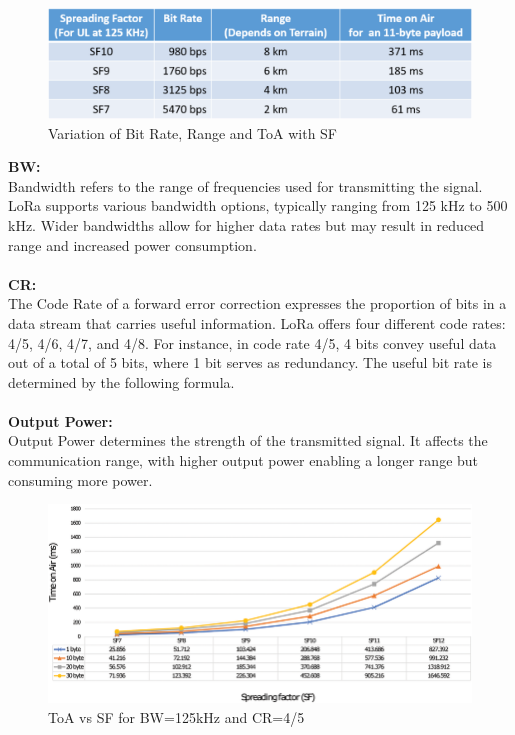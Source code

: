 \begin{figure}[htp!]
    \centering
    \includegraphics[scale=0.3]{images/sf with distance.png}
    \caption{Variation of Bit Rate, Range and \ac{ToA} with SF}
\end{figure}

\noindent\textbf{\ac{BW}:}\\

Bandwidth refers to the range of frequencies used for transmitting the signal. LoRa supports various bandwidth options, typically ranging from 125 kHz to 500 kHz. Wider bandwidths allow for higher data rates but may result in reduced range and increased power consumption.\\
\\
\textbf{\ac{CR}:}\\

The Code Rate of a forward error correction expresses the proportion of bits in a data stream that carries useful information. LoRa offers four different code rates: 4/5, 4/6, 4/7, and 4/8. For instance, in code rate 4/5, 4 bits convey useful data out of a total of 5 bits, where 1 bit serves as redundancy. The useful bit rate is determined by the following formula. \\
\\
\textbf{Output Power:}\\

Output Power determines the strength of the transmitted signal. It affects the communication range, with higher output power enabling a longer range but consuming more power.


\begin{figure}[htp!]
    \centering
    \includegraphics[scale=2]{images/LoRa-time-on-air-versus-SF-with-CD-4-5-and-125kHz-BW.png}
    \caption{ToA vs SF for BW=125kHz and CR=4/5}
\end{figure}

